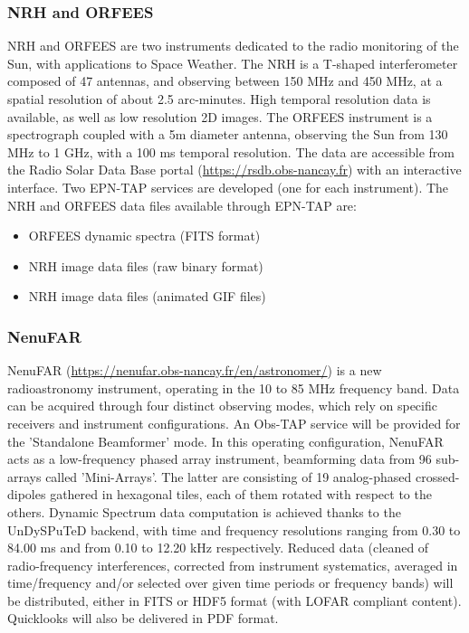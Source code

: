 \documentclass[11pt,a4paper]{ivoatex/ivoa}
\begin{document}
\subsubsection{NRH and ORFEES}
NRH and ORFEES are two instruments dedicated to the radio monitoring of the Sun, with applications to 
Space Weather. The NRH is a T-shaped interferometer composed of 47 antennas, and observing between 150 
MHz and 450 MHz, at a spatial resolution of about 2.5 arc-minutes. High temporal resolution data is 
available, as well as low resolution 2D images. The ORFEES instrument is a spectrograph coupled with a 
5m diameter antenna, observing the Sun from 130 MHz to 1 GHz, with a 100 ms temporal resolution. The 
data are accessible from the Radio Solar Data Base portal (\url{https://rsdb.obs-nancay.fr}) with an 
interactive interface. Two EPN-TAP services are developed (one for each instrument). The NRH and ORFEES data files available through EPN-TAP are:
\begin{itemize}
\item ORFEES dynamic spectra (FITS format)
\item NRH image data files (raw binary format)
\item NRH image data files (animated GIF files)
\end{itemize}


\subsubsection{NenuFAR}
NenuFAR (\url{https://nenufar.obs-nancay.fr/en/astronomer/}) is a new radioastronomy instrument, operating in the 10 to 85 MHz frequency band. Data can be acquired through four distinct observing modes, which rely on specific receivers and instrument configurations. An Obs-TAP service will be provided for the 'Standalone Beamformer' mode. In this operating configuration, NenuFAR acts as a low-frequency phased array instrument, beamforming data from 96 sub-arrays called 'Mini-Arrays'. The latter are consisting of 19 analog-phased crossed-dipoles gathered in hexagonal tiles, each of them rotated with respect to the others. Dynamic Spectrum data computation is achieved thanks to the UnDySPuTeD backend, with time and frequency resolutions ranging from 0.30 to 84.00 ms and from 0.10 to 12.20 kHz respectively. Reduced data (cleaned of radio-frequency interferences, corrected from instrument systematics, averaged in time/frequency and/or selected over given time periods or frequency bands) will be distributed, either in FITS or HDF5 format (with LOFAR compliant content). Quicklooks will also be delivered in PDF format.







\end{document}
